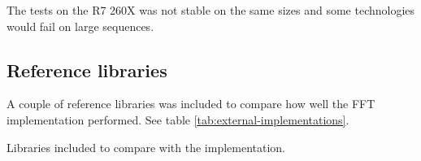 The tests on the R7 260X was not stable on the same sizes and some technologies would fail on large sequences.

\subsection{Reference libraries}

A couple of reference libraries was included to compare how well the FFT implementation performed. See table \ref{tab:external-implementations}.

\begin{table}
	\centering
	
	\caption{Libraries included to compare with the implementation.}
	\label{tab:external-implementations}
\end{table}
